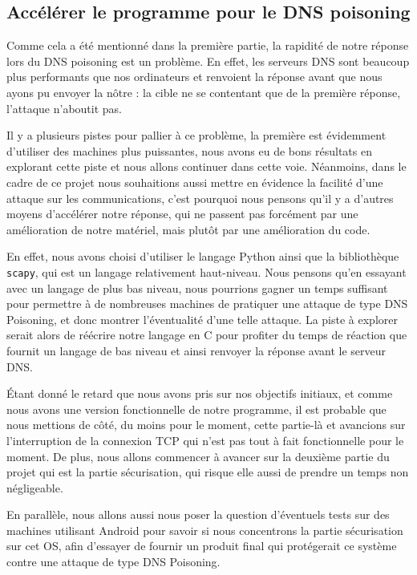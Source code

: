 \documentclass[a4paper, 12pt,twoside]{article}
\begin{document}
        \subsection{Accélérer le programme pour le DNS poisoning}

            Comme cela a été mentionné dans la première partie, la rapidité de notre réponse lors du DNS poisoning est un problème. En effet, les serveurs DNS sont beaucoup plus performants que nos ordinateurs et renvoient la réponse avant que nous ayons pu envoyer la nôtre : la cible ne se contentant que de la première réponse, l'attaque n'aboutit pas.

            Il y a plusieurs pistes pour pallier à ce problème, la première est évidemment d'utiliser des machines plus puissantes, nous avons eu de bons résultats en explorant cette piste et nous allons continuer dans cette voie. Néanmoins, dans le cadre de ce projet nous souhaitions aussi mettre en évidence la facilité d'une attaque sur les communications, c'est pourquoi nous pensons qu'il y a d'autres moyens d'accélérer notre réponse, qui ne passent pas forcément par une amélioration de notre matériel, mais plutôt par une amélioration du code.

            En effet, nous avons choisi d'utiliser le langage Python ainsi que la bibliothèque \verb!scapy!, qui est un langage relativement haut-niveau. Nous pensons qu'en essayant avec un langage de plus bas niveau, nous pourrions gagner un temps suffisant pour permettre à de nombreuses machines de pratiquer une attaque de type DNS Poisoning, et donc montrer l'éventualité d'une telle attaque. La piste à explorer serait alors de réécrire notre langage en C pour profiter du temps de réaction que fournit un langage de bas niveau et ainsi renvoyer la réponse avant le serveur DNS.

            Étant donné le retard que nous avons pris sur nos objectifs initiaux, et comme nous avons une version fonctionnelle de notre programme, il est probable que nous mettions de côté, du moins pour le moment, cette partie-là et avancions sur l'interruption de la connexion TCP qui n'est pas tout à fait fonctionnelle pour le moment. De plus, nous allons commencer à avancer sur la deuxième partie du projet qui est la partie sécurisation, qui risque elle aussi de prendre un temps non négligeable.

            En parallèle, nous allons aussi nous poser la question d'éventuels tests sur des machines utilisant Android pour savoir si nous concentrons la partie sécurisation sur cet OS, afin d'essayer de fournir un produit final qui protégerait ce système contre une attaque de type DNS Poisoning.
\end{document}
